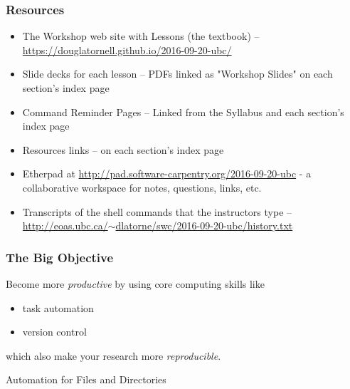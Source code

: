 \documentclass{beamer}
\begin{document}
\begin{frame}
  \frametitle{Resources}
  \begin{itemize}
    \item The Workshop web site with Lessons (the textbook) -- \href{https://douglatornell.github.io/2016-09-20-ubc/}{https://douglatornell.github.io/2016-09-20-ubc/}
    \item Slide decks for each lesson -- PDFs linked as "Workshop Slides" on each section's index page
    \item Command Reminder Pages -- Linked from the Syllabus and each section's index page
    \item Resources links -- on each section's index page
    \item Etherpad at \href{http://pad.software-carpentry.org/2016-09-20-ubc}{http://pad.software-carpentry.org/2016-09-20-ubc} - a collaborative workspace for notes, questions, links, etc.
    \item Transcripts of the shell commands that the instructors type -- \href{http://eoas.ubc.ca/~dlatorne/swc/2016-09-20-ubc/history.txt}{http://eoas.ubc.ca/$\sim$dlatorne/swc/2016-09-20-ubc/history.txt}
  \end{itemize}
\end{frame}


\begin{frame}
  \frametitle{The Big Objective}
  Become more {\em productive} by using core computing skills like
  \begin{itemize}
    \item task automation
    \item version control
  \end{itemize}
  which also make your research more {\em reproducible}.
\end{frame}


\begin{frame}
  \begin{block}{Automation for Files and Directories}
  \end{block}
\end{frame}
\end{document}

